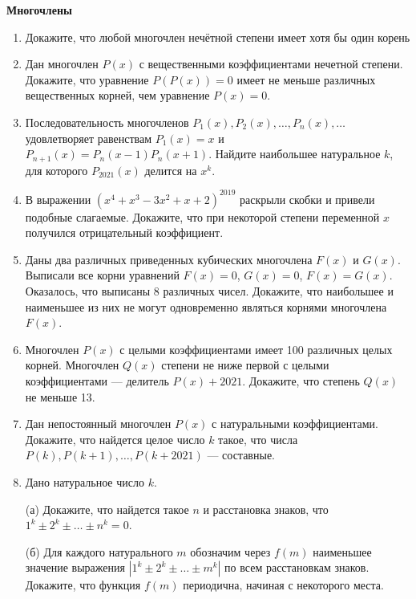 \documentclass{article}
\begin{document}
\large
	

\begin{center}
\textbf{Многочлены}
\end{center}

\begin{enumerate}[label*=\protect\fbox{\arabic{enumi}}]
	
\item Докажите, что любой многочлен нечётной степени имеет хотя бы один корень

\item Дан многочлен $P(x)$ с вещественными коэффициентами нечетной степени. Докажите, что уравнение $P(P(x)) = 0$ имеет не меньше различных вещественных корней, чем уравнение $P(x) = 0$.

\item Последовательность многочленов $P_1(x), P_2(x), \ldots, P_n(x), \ldots$ удовлетворяет равенствам $P_1(x) = x$ и $P_{n+1}(x) = P_n(x - 1)P_n(x + 1)$. Найдите наибольшее натуральное $k$, для которого $P_{2021}(x)$ делится на $x^k$.

\item В выражении $(x^4 + x^3 - 3x^2 + x + 2)^{2019}$ раскрыли скобки и привели подобные слагаемые. Докажите, что при некоторой степени переменной $x$ получился отрицательный коэффициент.

\item Даны два различных приведенных кубических многочлена $F(x)$ и $G(x)$. Выписали все корни уравнений $F(x) = 0$, $G(x) = 0$, $F(x) = G(x)$. Оказалось, что выписаны 8 различных чисел. Докажите, что наибольшее и наименьшее из них не могут одновременно являться корнями многочлена $F(x)$.

\item Многочлен $P(x)$ с целыми коэффициентами имеет 100 различных целых корней. Многочлен $Q(x)$ степени не ниже первой с целыми коэффициентами — делитель $P(x) + 2021$. Докажите, что степень $Q(x)$ не меньше 13.

\item Дан непостоянный многочлен $P(x)$ с натуральными коэффициентами. Докажите, что найдется целое число $k$ такое, что числа $P(k), P(k+1), \ldots, P(k+2021)$ — составные.

\item Дано натуральное число $k$.

(а) Докажите, что найдется такое $n$ и расстановка знаков, что $1^k \pm 2^k \pm \ldots \pm n^k = 0$.

(б) Для каждого натурального $m$ обозначим через $f(m)$ наименьшее значение выражения $|1^k \pm 2^k \pm \ldots \pm m^k|$ по всем расстановкам знаков. Докажите, что функция $f(m)$ периодична, начиная с некоторого места.


\end{enumerate}
\end{document}
